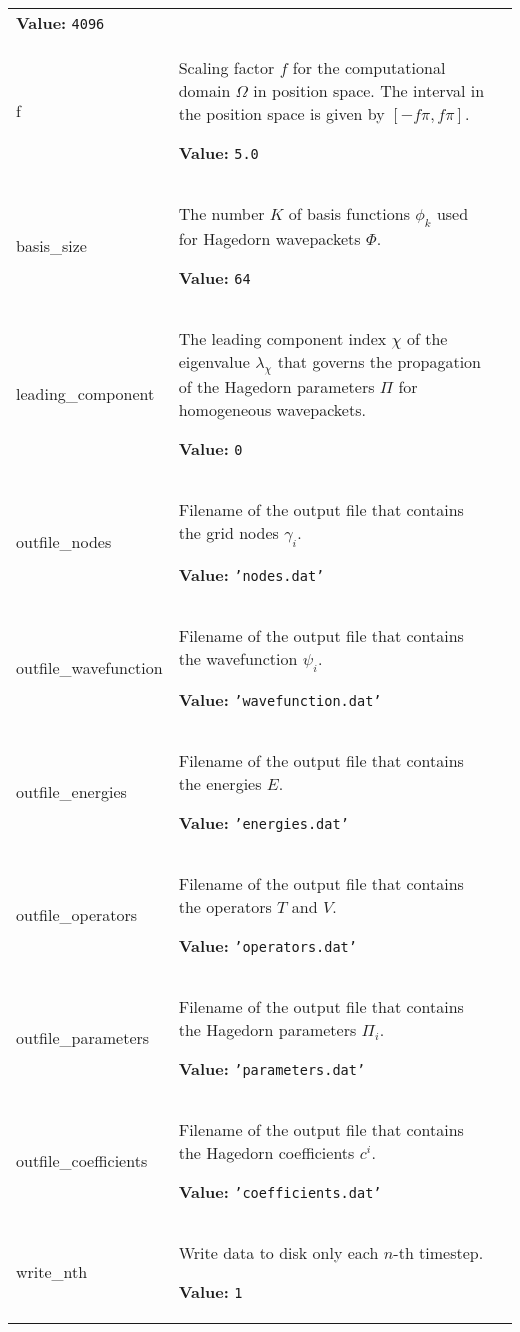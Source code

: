 \begin{longtable}{|p{\varnamewidth}|p{\vardescrwidth}|l}
\textbf{Value:}
{\tt 4096}&\\
\cline{1-2}
\raggedright f\- & \raggedright Scaling factor $f$ for the computational domain
          $\Omega$ in position space. The interval in the
          position space is given by $[-f\pi, f\pi]$.

\textbf{Value:}
{\tt 5.0}&\\
\cline{1-2}
\raggedright b\-a\-s\-i\-s\-\_\-s\-i\-z\-e\- & \raggedright The number $K$ of basis functions $\phi_k$
          used for Hagedorn wavepackets $\Phi$.

\textbf{Value:}
{\tt 64}&\\
\cline{1-2}
\raggedright l\-e\-a\-d\-i\-n\-g\-\_\-c\-o\-m\-p\-o\-n\-e\-n\-t\- & \raggedright The leading component index $\chi$ of the
          eigenvalue $\lambda_\chi$ that
          governs the propagation of the Hagedorn parameters
          $\Pi$ for homogeneous wavepackets.

\textbf{Value:}
{\tt 0}&\\
\cline{1-2}
\raggedright o\-u\-t\-f\-i\-l\-e\-\_\-n\-o\-d\-e\-s\- & \raggedright Filename of the output file that contains the grid nodes
          $\gamma_i$.

\textbf{Value:}
{\tt \texttt{'}\texttt{nodes.dat}\texttt{'}}&\\
\cline{1-2}
\raggedright o\-u\-t\-f\-i\-l\-e\-\_\-w\-a\-v\-e\-f\-u\-n\-c\-t\-i\-o\-n\- & \raggedright Filename of the output file that contains the wavefunction
          $\psi_i$.

\textbf{Value:}
{\tt \texttt{'}\texttt{wavefunction.dat}\texttt{'}}&\\
\cline{1-2}
\raggedright o\-u\-t\-f\-i\-l\-e\-\_\-e\-n\-e\-r\-g\-i\-e\-s\- & \raggedright Filename of the output file that contains the energies $E$.

\textbf{Value:}
{\tt \texttt{'}\texttt{energies.dat}\texttt{'}}&\\
\cline{1-2}
\raggedright o\-u\-t\-f\-i\-l\-e\-\_\-o\-p\-e\-r\-a\-t\-o\-r\-s\- & \raggedright Filename of the output file that contains the operators $T$
          and $V$.

\textbf{Value:}
{\tt \texttt{'}\texttt{operators.dat}\texttt{'}}&\\
\cline{1-2}
\raggedright o\-u\-t\-f\-i\-l\-e\-\_\-p\-a\-r\-a\-m\-e\-t\-e\-r\-s\- & \raggedright Filename of the output file that contains the Hagedorn
          parameters $\Pi_i$.

\textbf{Value:}
{\tt \texttt{'}\texttt{parameters.dat}\texttt{'}}&\\
\cline{1-2}
\raggedright o\-u\-t\-f\-i\-l\-e\-\_\-c\-o\-e\-f\-f\-i\-c\-i\-e\-n\-t\-s\- & \raggedright Filename of the output file that contains the Hagedorn
          coefficients $c^i$.

\textbf{Value:}
{\tt \texttt{'}\texttt{coefficients.dat}\texttt{'}}&\\
\cline{1-2}
\raggedright w\-r\-i\-t\-e\-\_\-n\-t\-h\- & \raggedright Write data to disk only each $n$-th timestep.

\textbf{Value:}
{\tt 1}&\\

\cline{1-2}
\end{longtable}

